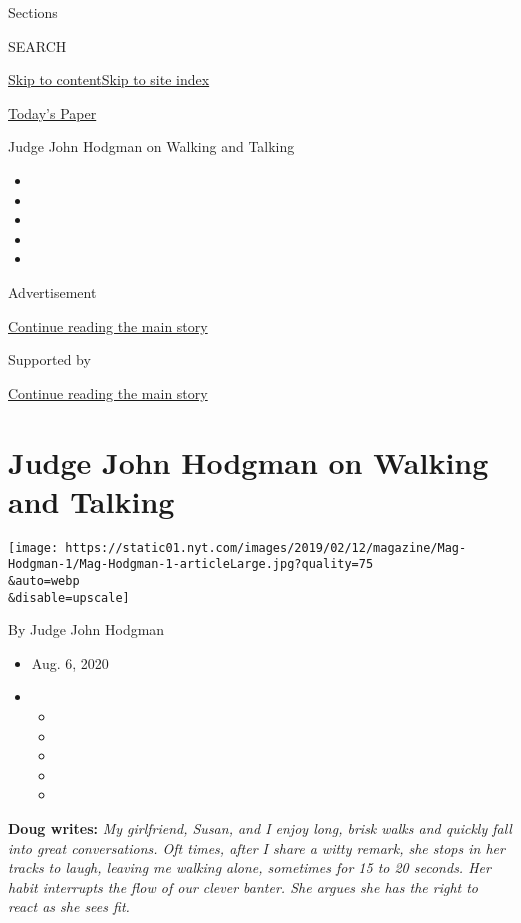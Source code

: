 Sections

SEARCH

\protect\hyperlink{site-content}{Skip to
content}\protect\hyperlink{site-index}{Skip to site index}

\href{https://myaccount.nytimes.com/auth/login?response_type=cookie\&client_id=vi}{}

\href{https://www.nytimes.com/section/todayspaper}{Today's Paper}

Judge John Hodgman on Walking and Talking

\begin{itemize}
\item
\item
\item
\item
\item
\end{itemize}

Advertisement

\protect\hyperlink{after-top}{Continue reading the main story}

Supported by

\protect\hyperlink{after-sponsor}{Continue reading the main story}

\hypertarget{judge-john-hodgman-on-walking-and-talking}{%
\section{Judge John Hodgman on Walking and
Talking}\label{judge-john-hodgman-on-walking-and-talking}}

\texttt{[image: https://static01.nyt.com/images/2019/02/12/magazine/Mag-Hodgman-1/Mag-Hodgman-1-articleLarge.jpg?quality=75\\\&auto=webp\\\&disable=upscale]}

By Judge John Hodgman

\begin{itemize}
\item
  Aug. 6, 2020
\item
  \begin{itemize}
  \item
  \item
  \item
  \item
  \item
  \end{itemize}
\end{itemize}

\textbf{Doug writes:} \emph{My girlfriend, Susan, and I enjoy long,
brisk walks and quickly fall into great conversations. Oft times, after
I share a witty remark, she stops in her tracks to laugh, leaving me
walking alone, sometimes for 15 to 20 seconds. Her habit interrupts the
flow of our clever banter. She argues she has the right to react as she
sees fit.}

